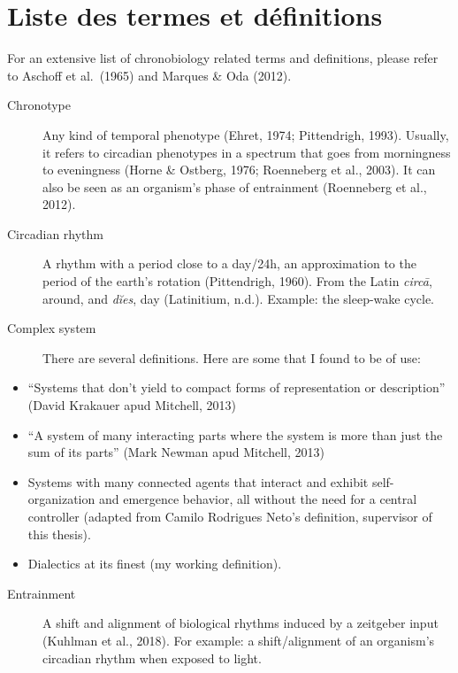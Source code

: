 \documentclass[
12pt,
openright,
oneside,
a4paper,
chapter=TITLE,
section=TITLE,
french,
spanish,
brazil,
english
]{abntex2}
\makeatletter
\let\oldparagraph\paragraph
\renewcommand{\paragraph}[1]{\oldparagraph{#1}\mbox{}}
\let\oldsubparagraph\subparagraph
\renewcommand{\subparagraph}[1]{\oldsubparagraph{#1}\mbox{}}
\providecommand{\tightlist}{
\setlength{\itemsep}{0pt}\setlength{\parskip}{0pt}}%
\newcommand{\listadetermosname}{Lista de termos e definições}
\renewcommand{\listadetermosname}{List of terms and definitions}
\renewcommand{\listadetermosname}{Lista de términos y definiciones}
\renewcommand{\listadetermosname}{Liste des termes et définitions}
\renewcommand{\pretextualchapter}[1]{
  \setlength{\afterchapskip}{4.5em}
  \addtocounter{abntex@bookmarkcounter}{1}
  \PRIVATEbookmarkthis{#1}
  \chapter*[#1]{#1}
}
\newenvironment{termos}{%
  \pretextualchapter{\listadetermosname}
}{
  \cleardoublepage
}
\makeatother
\begin{document}
\begin{termos}
For an extensive list of chronobiology related terms and definitions,
please refer to Aschoff et al.~(1965) and Marques \& Oda (2012).

\begin{description}
\item[Chronotype]
\hspace{20cm}

Any kind of temporal phenotype (Ehret, 1974; Pittendrigh, 1993).
Usually, it refers to circadian phenotypes in a spectrum that goes from
morningness to eveningness (Horne \& Ostberg, 1976; Roenneberg et al.,
2003). It can also be seen as an organism's phase of entrainment
(Roenneberg et al., 2012).
\end{description}

\begin{description}
\item[Circadian rhythm]
\hspace{20cm}

A rhythm with a period close to a day/24h, an approximation to the
period of the earth's rotation (Pittendrigh, 1960). From the Latin
\emph{circā}, around, and \emph{dĭes}, day (Latinitium, n.d.). Example:
the sleep-wake cycle.
\end{description}

\begin{description}
\item[Complex system]
\hspace{20cm}

There are several definitions. Here are some that I found to be of use:
\end{description}

\begin{itemize}
\tightlist
\item
  ``Systems that don't yield to compact forms of representation or
  description'' (David Krakauer apud Mitchell, 2013)
\item
  ``A system of many interacting parts where the system is more than
  just the sum of its parts'' (Mark Newman apud Mitchell, 2013)
\item
  Systems with many connected agents that interact and exhibit
  self-organization and emergence behavior, all without the need for a
  central controller (adapted from Camilo Rodrigues Neto's definition,
  supervisor of this thesis).
\item
  Dialectics at its finest (my working definition).
\end{itemize}

\begin{description}
\item[Entrainment]
\hspace{20cm}

A shift and alignment of biological rhythms induced by a zeitgeber input
(Kuhlman et al., 2018). For example: a shift/alignment of an organism's
circadian rhythm when exposed to light.
\end{description}
\end{termos}
\end{document}

